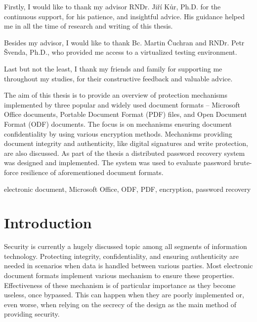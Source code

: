 \documentclass[11pt,oneside]{fithesis2}
\begin{document}
\FrontMatter
\ThesisTitlePage

\begin{ThesisDeclaration}
\DeclarationText
\AdvisorName
\end{ThesisDeclaration}

\begin{ThesisThanks}
Firstly, I would like to thank my advisor RNDr. Jiří Kůr, Ph.D. for the continuous support, for his patience, and insightful advice. His guidance helped me in all the time of research and writing of this thesis. 

Besides my advisor, I would like to thank Bc. Martin Čuchran and  RNDr. Petr Švenda, Ph.D., who provided me access to a virtualized testing environment. 

Last but not the least, I thank my friends and family for supporting me throughout my studies, for their constructive feedback and valuable advice. 
\end{ThesisThanks}

\begin{ThesisAbstract}
The aim of this thesis is to provide an overview of protection mechanisms implemented by three popular and widely used document formats -- Microsoft Office documents, Portable Document Format (PDF) files, and Open Document Format (ODF) documents. The focus is on mechanisms ensuring document confidentiality by using various encryption methods. Mechanisms providing document integrity and authenticity, like digital signatures and write protection, are also discussed. As part of the thesis a distributed password recovery system was designed and implemented. The system was used to evaluate password brute-force resilience of aforementioned document formats.  
\end{ThesisAbstract}

\begin{ThesisKeyWords}
electronic document, Microsoft Office, ODF, PDF, encryption, password recovery
\end{ThesisKeyWords}

\MainMatter

\tableofcontents 
\chapter{Introduction}

Security is currently a hugely discussed topic among all segments of information technology. Protecting integrity, confidentiality, and ensuring authenticity are needed in scenarios when data is handled between various parties. Most electronic document formats implement various mechanism to ensure these properties. Effectiveness of these mechanism is of particular importance as they become useless, once bypassed. This can happen when they are poorly implemented or, even worse, when relying on the secrecy of the design as the main method of providing security.
\end{document}
